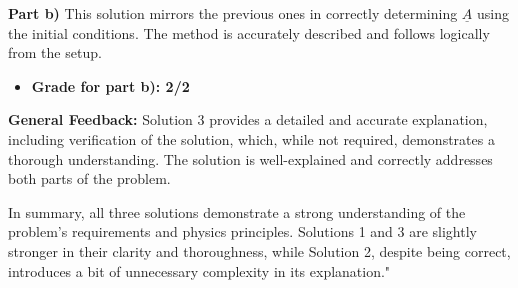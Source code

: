 \documentclass[a4paper,11pt]{article}
\begin{document}
\textbf{Part b)} This solution mirrors the previous ones in correctly determining \( \underline{A} \) using the initial conditions. The method is accurately described and follows logically from the setup.
\begin{itemize}
    \item \textbf{Grade for part b): 2/2}
\end{itemize}

\textbf{General Feedback:} Solution 3 provides a detailed and accurate explanation, including verification of the solution, which, while not required, demonstrates a thorough understanding. The solution is well-explained and correctly addresses both parts of the problem.

In summary, all three solutions demonstrate a strong understanding of the problem's requirements and physics principles. Solutions 1 and 3 are slightly stronger in their clarity and thoroughness, while Solution 2, despite being correct, introduces a bit of unnecessary complexity in its explanation."
\end{document}
